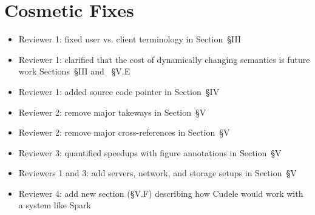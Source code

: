 \documentclass[onecolumn,conference]{IEEEtran}
\begin{document}
\section*{Cosmetic Fixes}
\begin{itemize}
  \item Reviewer 1: fixed user vs. client terminology in Section~{\S}III
  \item Reviewer 1: clarified that the cost of dynamically changing semantics is future work Sections~{\S}III and ~{\S}V.E
  \item Reviewer 1: added source code pointer in Section~{\S}IV
  \item Reviewer 2: remove major takeways in Section~{\S}V
  \item Reviewer 2: remove major cross-references in Section~{\S}V
  \item Reviewer 3: quantified speedups with figure annotations in Section~{\S}V
  \item Reviewers 1 and 3: add servers, network, and storage setups in Section~{\S}V
  \item Reviewer 4: add new section ({\S}V.F) describing how Cudele would work with a system like Spark
\end{itemize}



\end{document}
